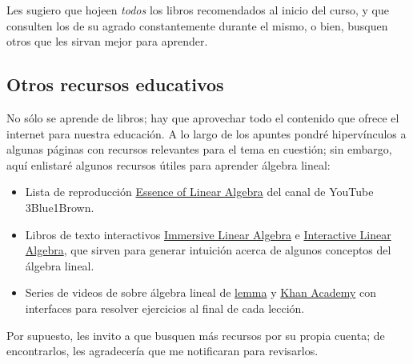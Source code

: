 \documentclass[12pt,dvipsnames]{article}
\begin{document}
Les sugiero que hojeen \emph{todos} los libros recomendados al inicio del curso, y que consulten los de su agrado constantemente durante el mismo, o bien, busquen otros que les sirvan mejor para aprender.

\subsection{Otros recursos educativos}

No sólo se aprende de libros; hay que aprovechar todo el contenido que ofrece el internet para nuestra educación. A lo largo de los apuntes pondré hipervínculos a algunas páginas con recursos relevantes para el tema en cuestión; sin embargo, aquí enlistaré algunos recursos útiles para aprender álgebra lineal:

\begin{itemize}
    \item Lista de reproducción \href{https://www.youtube.com/watch?v=fNk_zzaMoSs&list=PLZHQObOWTQDPD3MizzM2xVFitgF8hE_ab}{Essence of Linear Algebra} del canal de YouTube 3Blue1Brown.
    \item Libros de texto interactivos \href{{http://immersivemath.com/ila/learnmore.html}}{Immersive Linear Algebra} e \href{https://textbooks.math.gatech.edu/ila/index2.html}{Interactive Linear Algebra}, que sirven para generar intuición acerca de algunos conceptos del álgebra lineal.
    \item Series de videos de sobre álgebra lineal de \href{https://www.lem.ma/books/AIApowDnjlDDQrp-uOZVow/landing}{lemma} y \href{https://www.khanacademy.org/math/linear-algebra}{Khan Academy} con interfaces para resolver ejercicios al final de cada lección.
\end{itemize}

Por supuesto, les invito a que busquen más recursos por su propia cuenta; de encontrarlos, les agradecería que me notificaran para revisarlos.
\end{document}
